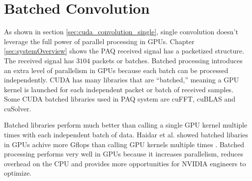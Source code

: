 \section{Batched Convolution}
As shown in section \ref{sec:cuda_convolution_single}, single convolution doesn't leverage the full power of parallel processing in GPUs.
Chapter \ref{sec:systemOverview} shows the PAQ received signal has a packetized structure.
The received signal has $3104$ packets or batches.
Batched processing introduces an extra level of parallelism in GPUs because each batch can be processed independently.
CUDA has many libraries that are ``batched,'' meaning a GPU kernel is launched for each independent packet or batch of received samples.
Some CUDA batched libraries used in PAQ system are cuFFT, cuBLAS and cuSolver.

Batched libraries perform much better than calling a single GPU kernel multiple times with each independent batch of data.
Haidar et al. showed batched libaries in GPUs achive more Gflops than calling GPU kernels multiple times \cite{haidar2015optimization}.
Batched processing performs very well in GPUs because it increases parallelism, reduces overhead on the CPU and provides more opportunities for NVIDIA engineers to optimize.

